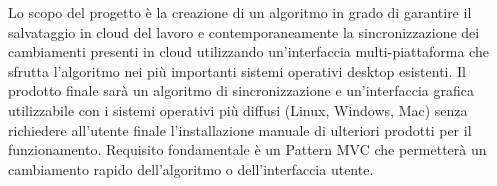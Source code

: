 Lo scopo del progetto è la creazione di un algoritmo in grado di garantire il salvataggio in cloud del lavoro e contemporaneamente la sincronizzazione dei cambiamenti presenti in cloud utilizzando un'interfaccia multi-piattaforma che sfrutta l'algoritmo nei più importanti sistemi operativi desktop esistenti.
Il prodotto finale sarà un algoritmo di sincronizzazione e un'interfaccia grafica utilizzabile con i sistemi operativi più diffusi (Linux, Windows, Mac) senza richiedere all'utente finale l'installazione manuale di ulteriori prodotti per il funzionamento. Requisito fondamentale è un Pattern MVC che permetterà un cambiamento rapido dell'algoritmo o dell'interfaccia utente.

